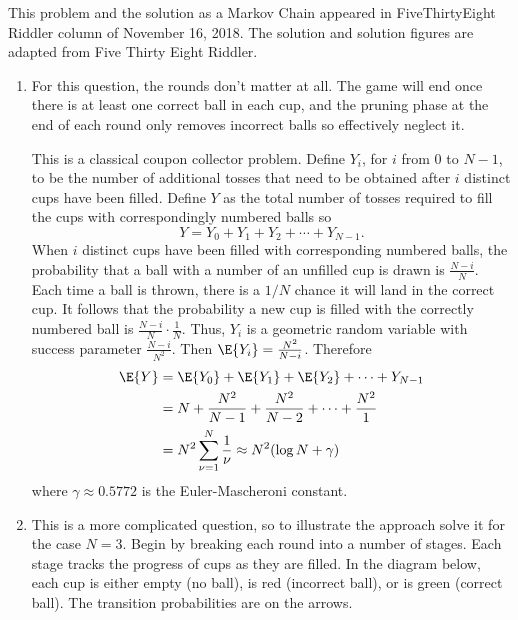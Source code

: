 \documentclass[12pt]{article}
\begin{document}
\begin{solution}
    \begin{remark}
        This problem and the solution as a Markov Chain appeared in
        {FiveThirtyEight} Riddler column of November 16, 2018.  The
        solution and solution figures are adapted from 
        {Five Thirty Eight Riddler}.
    \end{remark}

    \begin{enumerate}[label=(\alph*)]
    \item
        For this question, the rounds don't matter at all.  The game
        will end once there is at least one correct ball in each cup,
        and the pruning phase at the end of each round only removes
        incorrect balls so effectively neglect it.

        This is a classical coupon collector problem.  Define \( Y_i \),
        for \( i \) from \( 0 \) to \( N - 1 \), to be the number of
        additional tosses that need to be obtained after \( i \)
        distinct cups have been filled.  Define \( Y \) as the total
        number of tosses required to fill the cups with correspondingly
        numbered balls so
        \[
            Y = Y_0 + Y_1 + Y_2 + \cdots + Y_{N-1}.
        \] When \( i \) distinct cups have been filled with
        corresponding numbered balls, the probability that a ball with a
        number of an unfilled cup is drawn is \( \frac{N-i}{N} \).  Each
        time a ball is thrown, there is a \( 1/N \) chance it will land
        in the correct cup.  It follows that the probability a new cup
        is filled with the correctly numbered ball is \( \frac{N-i}{N}
        \cdot \frac{1}{N} \).  Thus, \( Y_i \) is a geometric random
        variable with success parameter \( \frac{N-i}{N^2} \).  Then \(
        \E{Y_i} = \frac{N^2}{N-i} \).  Therefore
        \begin{align*}
            \E{Y} &= \E{Y_0} + \E{Y_1} + \E{Y_2} + \cdots + Y_{N-1} \\
            &= N + \frac{N^2}{N-1} + \frac{N^2}{N-2} + \cdots + \frac{N^2}
            {1} \\
            &= N^2 \sum_{\nu=1}^N \frac{1}{\nu} \approx N^2(\log N +
            \gamma)
        \end{align*}
        where \( \gamma \approx 0.5772 \) is the Euler-Mascheroni
        constant.
    \item
        This is a more complicated question, so to illustrate the
        approach solve it for the case \( N=3 \).  Begin by breaking
        each round into a number of stages.  Each stage tracks the
        progress of cups as they are filled.  In the diagram below, each
        cup is either empty (no ball), is red (incorrect ball), or is
        green (correct ball).  The transition probabilities are on the
        arrows.


\end{enumerate}
\end{solution}
\end{document}
